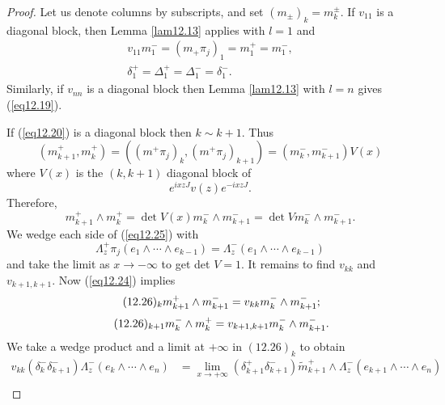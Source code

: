 \documentclass{surv-l}
\theoremstyle{plain}
\theoremstyle{definition}
\numberwithin{equation}{chapter}
\begin{document}
\begin{proof}
Let us denote columns by subscripts, and set $(m_{\pm})_{k}=m_{k}^{\pm}$. If $v_{11}$ is a diagonal block, then Lemma \ref{lam12.13} applies with $l=1$ and
\begin{equation*}
\begin{array}{c}
v_{11}m_{1}^{-}=(m_{+}\pi_{j})_{1}=m_{1}^{+}=m_{1}^{-},\\
\delta_{1}^{+}=\Delta_{1}^{+}=\Delta_{1}^{-}=\delta_{1}^{-}.
\end{array}
\end{equation*}
Similarly, if $v_{nn}$ is a diagonal block then Lemma \ref{lam12.13} with $l=n$ gives (\ref{eq12.19}).

If (\ref{eq12.20}) is a diagonal block then $k\sim k+1$. Thus
\begin{equation}\label{eq12.24}
(m_{k+1}^{+}, m_{k}^{+})=((m^{+}\pi_{j})_{k}, (m^{+}\pi_{j})_{k+1})=(m_{k}^{-}, m_{k+1}^{-})V(x)
\end{equation}
where $V(x)$ is the $(k, k+1)$ diagonal block of
\begin{equation*}
e^{ixzJ}v(z)e^{-ixzJ}.
\end{equation*}
Therefore,
\begin{equation}\label{eq12.25}
m_{k+1}^{+}\wedge m_{k}^{+}=\det V(x)m_{k}^{-}\wedge m_{k+1}^{-}=\det Vm_{k}^{-}\wedge m_{k+1}^{-}.
\end{equation}
We wedge each side of (\ref{eq12.25}) with
\begin{equation*}
\Lambda_{z}^{+}\pi_{j}(e_{1}\wedge\cdots \wedge e_{k-1})=\Lambda_{z}^{-}(e_{1}\wedge\cdots\wedge e_{k-1})
\end{equation*}
and take the limit as $ x\rightarrow -\infty$ to get det $V=1$. It remains to find $v_{kk}$ and $v_{k+1,k+1}$. Now (\ref{eq12.24}) implies
\begin{equation*}
\tag*{$(12.26)_{k}$}  m_{k+1}^{+}\wedge m_{k+1}^{-}=v_{kk}m_{k}^{-}\wedge m_{k+1}^{-};
\end{equation*}
\begin{equation*}
\tag*{$(12.26)_{k+1}$}  m_{k}^{-}\wedge m_{k}^{+}=v_{k+1,k+1}m_{k}^{-}\wedge m_{k+1}^{-}.
\end{equation*}
We take a wedge product and a limit at $+\infty$ in $(12.26)_{k}$ to obtain
\setcounter{equation}{26}\begin{align}\label{eq12.27}
v_{kk}(\delta_{k}^{-}\delta_{k+1}^{-})\Lambda_{z}^{-}(e_{k}\wedge\cdots \wedge e_{n})
&= \lim_{x\rightarrow+\infty}(\delta_{k+1}^{+}\delta_{k+1}^{-})\tilde{m}_{k+1}^{+}\wedge\Lambda_{z}^{-}(e_{k+1}\wedge\cdots\wedge e_{n})\\\nonumber

\end{align}
\end{proof}
\end{document}
